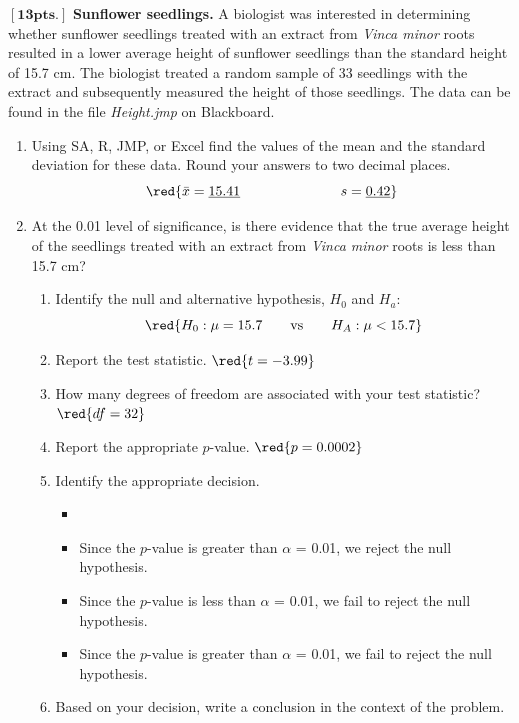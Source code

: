 \item $\mathbf{[13pts.]}$ \textbf{Sunflower seedlings.} A biologist was interested in determining whether sunflower seedlings treated with an extract from \textit{Vinca minor} roots resulted in a lower average height of sunflower seedlings than the standard height of 15.7 cm. The biologist treated a random sample of 33 seedlings with the extract and subsequently measured the height of those seedlings. The data can be found in the file \emph{Height.jmp} on Blackboard.

\begin{enumerate}
\item  Using SA, R, JMP, or Excel find the values of the mean and the standard deviation for these data. Round your answers to two decimal places.\\
$$\red{\bar{x} =  \underline{15.41}   \hspace{1in}  s = \underline{0.42}}$$
\item  At the 0.01 level of significance, is there evidence that the true average height of the seedlings treated with an extract from \textit{Vinca minor} roots is less than 15.7 cm?
\begin{enumerate}
\item  Identify the null and alternative hypothesis, $H_0$ and $H_a$:
$$\red{H_0: \mu = 15.7 \qquad \hbox{vs} \qquad H_A: \mu < 15.7}$$

\item  Report the test statistic. $\red{t = -3.99}$
\item  How many degrees of freedom are associated with your test statistic? $\red{df = 32}$
\item  Report the appropriate $p$-value. $\red{p = 0.0002}$
\item  Identify the appropriate decision. 
\begin{itemize}
	\item {}
	\item Since the $p$-value is greater than $\alpha$ = 0.01, we reject the null hypothesis.
	\item Since the $p$-value is less than $\alpha$ = 0.01, we fail to reject the null hypothesis.
	\item Since the $p$-value is greater than $\alpha$ = 0.01, we fail to reject the null hypothesis.
\end{itemize}
\item  Based on your decision, write a conclusion in the context of the problem.\\


\end{enumerate}
\end{enumerate}
